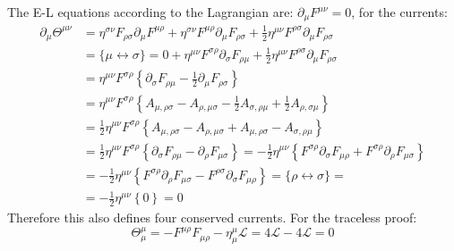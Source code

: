 \documentclass{article}
\newcommand{\pd}{\partial}  %
\newcommand{\pdm}{\partial_\mu}  %
\newcommand{\Lag}{\mathcal{L}}  %
\newcommand{\onehalf}{\frac{1}{2}}
\begin{document}
The E-L equations according to the Lagrangian are: $\pdm F^{\mu\nu} = 0$, for the currents:
\begin{equation}
    \begin{split}
        \pdm \Theta^{\mu\nu} & = \eta^{\sigma\nu}F_{\rho\sigma}\pdm F^{\mu\rho} + \eta^{\sigma\nu}F^{\mu\rho}\pdm F_{\rho\sigma}+\frac{1}{2}\eta^{\mu\nu}F^{\rho\sigma}\pdm F_{\rho\sigma}\\
        & = \{ \text{$\mu \leftrightarrow \sigma $}\}= 0 + \eta^{\mu\nu}F^{\sigma\rho}\pd_\sigma F_{\rho\mu} + \onehalf 
        \eta^{\mu\nu}F^{\rho\sigma}\pdm F_{\rho\sigma} \\
        & = \eta^{\mu\nu}F^{\sigma\rho} \left\{\pd_\sigma F_{\rho\mu} - \onehalf \pdm F_{\rho\sigma} \right\} \\
        & = \eta^{\mu\nu}F^{\sigma\rho} \left\{A_{\mu,\rho\sigma} - A_{\rho,\mu\sigma} - \onehalf A_{\sigma,\rho\mu} + \onehalf A_{\rho,\sigma\mu}  \right\} \\
        & = \onehalf \eta^{\mu\nu}F^{\sigma\rho} \left\{ A_{\mu,\rho\sigma} - A_{\rho,\mu\sigma} +  A_{\mu,\rho\sigma} - A_{\sigma,\rho\mu} \right\} \\
        & = \onehalf \eta^{\mu\nu}F^{\sigma\rho} \left\{ \pd_\sigma F_{\rho\mu} - \pd_\rho F_{\mu\sigma} \right\} = -
        \onehalf \eta^{\mu\nu} \left\{ F^{\sigma\rho}\pd_{\sigma}F_{\mu\rho} + F^{\sigma\rho}\pd_{\rho}F_{\mu\sigma} \right\}\\
        & = -\onehalf \eta^{\mu\nu} \left\{ F^{\sigma\rho} \pd_{\rho} F_{\mu\sigma} - F^{\rho\sigma}\pd_\sigma F_{\mu\rho}  \right\} = \{ \text{$\rho \leftrightarrow \sigma $}\}= \\
        & = -\onehalf \eta^{\mu\nu} \left\{ 0 \right\} = 0
    \end{split}
\end{equation}
Therefore this also defines four conserved currents. For the traceless proof:
\begin{equation}
    \Theta^\mu_\mu = -F^{\mu\rho}F_{\mu\rho} - \eta^{\mu}_\mu \Lag = 4\Lag - 4\Lag = 0
\end{equation}
\end{document}
